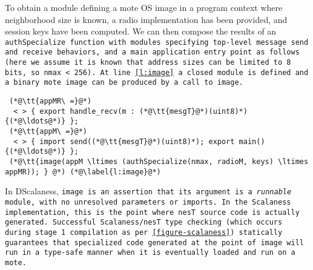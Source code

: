 To obtain a module defining a mote OS image in a program context where neighborhood size is
known, a radio implementation has been provided, and session keys have been computed. We can
then compose the results of an \tt{authSpecialize} function with modules specifying top-level
message send and receive behaviors, and a \texttt{main} application entry point as follows (here
we assume it is known that address sizes can be limited to 8 bits, so \tt{nmax} < 256). At line
\ref{l:image} a closed module is defined and a binary mote image can be produced by a call to
\tt{image}. \lstset{numbers=left, numberstyle=\tiny, firstnumber=26, stepnumber=1,
  numbersep=0pt, basicstyle=\ttfamily}
 {\scriptsize
\begin{lstlisting}
 (*@\tt{appMR\ =}@*) 
  < > { export handle_recv(m : (*@\tt{mesgT}@*)(uint8)*) {(*@\ldots@*)} }; 
 (*@\tt{appM\ =}@*) 
  < > { import send((*@\tt{mesgT}@*)(uint8)*); export main() {(*@\ldots@*)} };  
 (*@\tt{image(appM \ltimes (authSpecialize(nmax, radioM, keys) \ltimes appMR)); } @*) (*@\label{l:image}@*)  
\end{lstlisting}}
\noindent In DScalaness, \tt{image} is an assertion that its argument is a \emph{runnable}
module, with no unresolved parameters or imports. In the Scalaness implementation, this is the
point where nesT source code is actually generated.
Successful Scalaness/nesT type checking (which occurs during stage 1 compilation as per
\autoref{figure-scalaness}) statically guarantees that specialized code generated at the point
of \tt{image} will run in a type-safe manner when it is eventually loaded and run on a mote.
